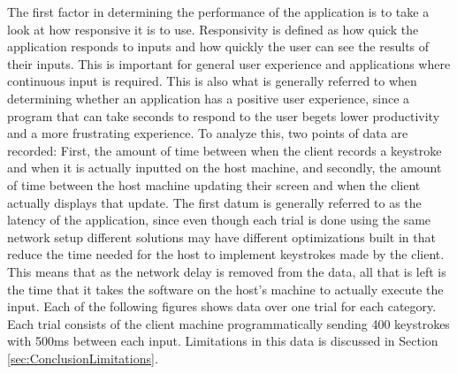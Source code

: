 The first factor in determining the performance of the application is to take a look at how responsive it is to use.
Responsivity is defined as how quick the application responds to inputs and how quickly the user can see the results of their inputs.
This is important for general user experience and applications where continuous input is required.
This is also what is generally referred to when determining whether an application has a positive user experience, since a program that can take seconds to respond to the user begets lower productivity and a more frustrating experience.
To analyze this, two points of data are recorded: First, the amount of time between when the client records a keystroke and when it is actually inputted on the host machine, and secondly, the amount of time between the host machine updating their screen and when the client actually displays that update.
The first datum is generally referred to as the latency of the application, since even though each trial is done using the same network setup different solutions may have different optimizations built in that reduce the time needed for the host to implement keystrokes made by the client.
This means that as the network delay is removed from the data, all that is left is the time that it takes the software on the host's machine to actually execute the input.
Each of the following figures shows data over one trial for each category.
Each trial consists of the client machine programmatically sending 400 keystrokes with 500ms between each input.
Limitations in this data is discussed in Section \ref{sec:ConclusionLimitations}.
